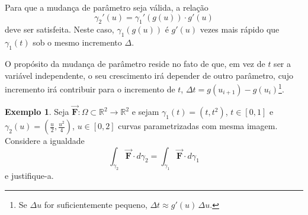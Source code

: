 \documentclass[11pt]{article}
\theoremstyle{definition}
\newtheorem{exemplo}{Exemplo}
\begin{document}
	Para que a mudança de parâmetro seja válida, a relação
	\begin{equation*}
		\gamma_2'(u)=\gamma_1'(g(u))\cdot g'(u)
	\end{equation*}
	deve ser satisfeita. Neste caso, $\gamma_1(g(u))$ é $g'(u)$ vezes mais rápido que $\gamma_1(t)$ sob o mesmo incremento $\Delta$.
	
	O propósito da mudança de parâmetro reside no fato de que, em vez de $t$ ser a variável independente, o seu crescimento irá depender de outro parâmetro, cujo incremento irá contribuir para o incremento de $t$, $\Delta t=g(u_{i+1})-g(u_i)$\footnote{Se $\Delta u$ for suficientemente pequeno, $\Delta t\approx g'(u)\, \Delta u$.}.
	
	\begin{exemplo}
		Seja $\boldsymbol{\vec{F}}:\Omega \subset \mathbb{R}^2\to \mathbb{R}^2$ e sejam $\gamma_1(t)=(t,t^2)$, $t\in [0,1]$ e $\gamma_2(u)=\left(\frac{u}{2},\frac{u^2}{4}\right)$, $u\in [0,2]$ curvas parametrizadas com mesma imagem. Considere a igualdade
		\begin{equation*}
			\int_{\gamma_2}\boldsymbol{\vec{F}}\cdot d\gamma_2=\int_{\gamma_1}\boldsymbol{\vec{F}}\cdot d\gamma_1
		\end{equation*}
		e justifique-a.
	\end{exemplo}
\end{document}
